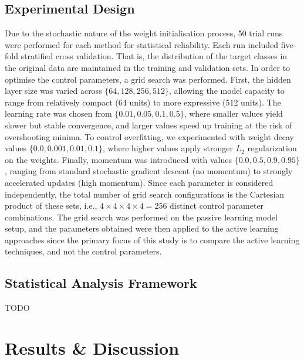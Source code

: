 \documentclass[10pt, conference]{IEEEtran}
\begin{document}
\subsection{Experimental Design}
Due to the stochastic nature of the weight initialisation process, 50 trial runs were performed for each method for statistical reliability. Each run included five-fold stratified cross validation. That is, the distribution of the target classes in the original data are maintained in the training and validation sets. In order to optimise the control parameters, a grid search was performed. First, the hidden layer size was varied across $\{64, 128, 256, 512\}$, allowing the model capacity to range from relatively compact (64 units) to more expressive (512 units). The learning rate was chosen from  $\{0.01, 0.05, 0.1, 0.5\}$, where smaller values yield slower but stable convergence, and larger values speed up training at the risk of overshooting minima. To control overfitting, we experimented with weight decay values $\{0.0, 0.001, 0.01, 0.1\}$, where higher values apply stronger $L_2$ regularization on the weights. Finally, momentum was introduced with values $\{0.0, 0.5, 0.9, 0.95\}$, ranging from standard stochastic gradient descent (no momentum) to strongly accelerated updates (high momentum). Since each parameter is considered independently, the total number of grid search configurations is the Cartesian product of these sets, i.e., $4 \times 4 \times 4 \times 4 = 256$ distinct control parameter combinations. The grid search was performed on the passive learning model setup, and the parameters obtained were then applied to the active learning approaches since the primary focus of this study is to compare the active learning techniques, and not the control parameters.

\subsection{Statistical Analysis Framework}
TODO

\section{Results \& Discussion}
\end{document}

